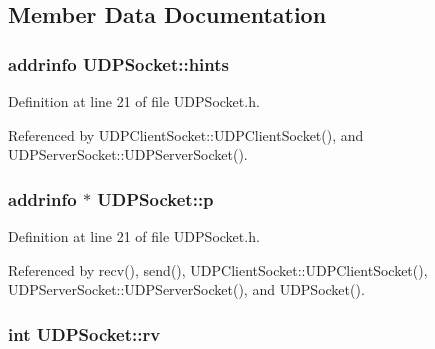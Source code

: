 \subsection{Member Data Documentation}
\hypertarget{classUDPSocket_ab0ca283a6135c7073b7a1168014ae088}{
\subsubsection[{hints}]{\setlength{\rightskip}{0pt plus 5cm}addrinfo U\+D\+P\+Socket\+::hints\hspace{0.3cm}{\ttfamily [protected]}}}\label{classUDPSocket_ab0ca283a6135c7073b7a1168014ae088}


Definition at line 21 of file U\+D\+P\+Socket.\+h.



Referenced by U\+D\+P\+Client\+Socket\+::\+U\+D\+P\+Client\+Socket(), and U\+D\+P\+Server\+Socket\+::\+U\+D\+P\+Server\+Socket().

\hypertarget{classUDPSocket_a9889d73171c2d143797dce81506d24eb}{
\subsubsection[{p}]{\setlength{\rightskip}{0pt plus 5cm}addrinfo $\ast$ U\+D\+P\+Socket\+::p\hspace{0.3cm}{\ttfamily [protected]}}}\label{classUDPSocket_a9889d73171c2d143797dce81506d24eb}


Definition at line 21 of file U\+D\+P\+Socket.\+h.



Referenced by recv(), send(), U\+D\+P\+Client\+Socket\+::\+U\+D\+P\+Client\+Socket(), U\+D\+P\+Server\+Socket\+::\+U\+D\+P\+Server\+Socket(), and U\+D\+P\+Socket().

\hypertarget{classUDPSocket_a8b28284b39fbfbd8bca4c1289f7dda32}{
\subsubsection[{rv}]{\setlength{\rightskip}{0pt plus 5cm}int U\+D\+P\+Socket\+::rv\hspace{0.3cm}{\ttfamily [protected]}}}\label{classUDPSocket_a8b28284b39fbfbd8bca4c1289f7dda32}


